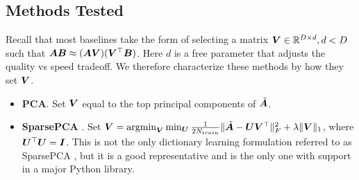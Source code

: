 \subsection{Methods Tested}
Recall that most baselines take the form of selecting a matrix $\bm{V} \in \mathbb{R}^{D \times d}, d < D$ such that $\bm{A} \bm{B} \approx (\bm{A} \bm{V}) (\bm{V}^\top \bm{B})$. Here $d$ is a free parameter that adjusts the quality vs speed tradeoff. We therefore characterize these methods by how they set $\bm{V}$.
\vspace{-2mm}
\begin{itemize}\itemsep0em
    \item \textbf{PCA}. Set $\bm{V}$ equal to the top principal components of $\tilde{\bm{A}}$.
    \item \textbf{SparsePCA} \cite{sparsePCA}. Set $\bm{V} = \operatorname*{argmin}_{\bm{V}} \min_{\bm{U}} \frac{1}{2 N_{train}} \lVert \tilde{\bm{A}} - \bm{U}\bm{V}^\top \rVert^2_F + \lambda \lVert\bm{V}\rVert_1$, where $\bm{U}^\top \bm{U} = \bm{I}$. This is not the only dictionary learning formulation referred to as SparsePCA \cite{spcaSurvey1,spcaSurvey2}, but it is a good representative and is the only one with support in a major Python library.%



\end{itemize}
